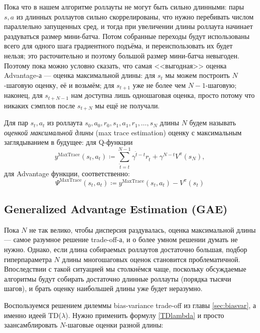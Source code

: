 Пока что в нашем алгоритме роллауты не могут быть сильно длинными: пары $s, a$ из длинных роллаутов сильно скоррелированы, что нужно перебивать числом параллельно запущенных сред, и тогда при увеличении длины роллаута начинает раздуваться размер мини-батча. Потом собранные переходы будут использованы всего для одного шага градиентного подъёма, и переиспользовать их будет нельзя; это расточительно и поэтому большой размер мини-батча невыгоден. Поэтому пока можно условно сказать, что самая <<выгодная>> оценка Advantage-а --- оценка максимальной длины: для $s_t$ мы можем построить $N$-шаговую оценку, её и возьмём; для $s_{t+1}$ уже не более чем $N-1$-шаговую; наконец, для $s_{t+N-1}$ нам доступна лишь одношаговая оценка, просто потому что никаких сэмплов после $s_{t+N}$ мы ещё не получали. 

\begin{definition}
Для пар $s_t, a_t$ из роллаута $s_0, a_0, r_0, s_1, a_1, r_1, \dots, s_N$ длины $N$ будем называть \emph{оценкой максимальной длины} (max trace estimation) оценку с максимальным заглядыванием в будущее: для Q-функции
\begin{equation}\label{maxtrace}
y^{\mathrm{MaxTrace}} (s_t, a_t) \coloneqq \sum_{\hat{t}=t}^{N-1} \gamma^{\hat{t}-t} r_{\hat{t}} + \gamma^{N-t} V^\pi(s_N),
\end{equation}
для Advantage функции, соответственно:
\begin{equation*}\label{maxtraceadvantage}
\Psi^{\mathrm{MaxTrace}} (s_t, a_t) \coloneqq y^{\mathrm{MaxTrace}} (s_t, a_t) - V^\pi(s_t)
\end{equation*}
\end{definition}

\subsection{Generalized Advantage Estimation (GAE)}

Пока $N$ не так велико, чтобы дисперсия раздувалась, оценка максимальной длины --- самое разумное решение trade-off-а, и о более умном решении думать не нужно. Однако, если длина собираемых роллаутов достаточно большая, подбор гиперпараметра $N$ длины многошаговых оценок становится проблематичной. Впоследствии с такой ситуацией мы столкнёмся чаще, поскольку обсуждаемые алгоритмы будут собирать достаточно длинные роллауты (порядка тысячи шагов), и брать оценку наибольшей длины уже будет неразумно.

Воспользуемся решением дилеммы bias-variance trade-off из главы \ref{sec:biasvar}, а именно идеей TD($\lambda$). Нужно применить формулу \eqref{TDlambda} и просто заансамблировать $N$-шаговые оценки разной длины:

